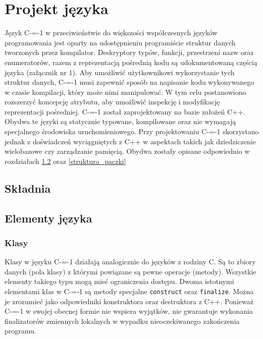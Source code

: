 \section{Projekt języka}
\label{Language_desig}
Język C-=-1 w przeciwieństwie do większości współczesnych języków programowania jest oparty na udostępnieniu programiście struktur danych tworzonych przez kompilator. Deskryptory typów, funkcji, przestrzeni nazw oraz enumeratorów, razem z reprezentacją pośrednią kodu są udokumentowaną częścią języka (załącznik nr 1).
Aby umożliwić użytkownikowi wykorzystanie tych struktur danych, C-=-1 musi zapewnić sposób na napisanie kodu wykonywanego w czasie kompilacji, który może nimi manipulować. W tym celu postanowiono rozszerzyć koncepcję atrybutu, aby umożliwić inspekcję i modyfikację reprezentacji pośredniej.
C-=-1 został zaprojektowany na bazie założeń C++. Obydwa te języki są statycznie typowane, kompilowane oraz nie wymagają specjalnego środowiska uruchomieniowego.
Przy projektowaniu C-=-1 skorzystano jednak z doświadczeń wyciągniętych z C++ w aspektach takich jak dziedziczenie wielobazowe czy zarządzanie pamięcią. Obydwa zostały opisane odpowiednio w rozdziałach \ref{elementy_jezyka} oraz \ref{struktura_paczki}

\subsection{Składnia}

\subsection{Elementy języka}
\label{elementy_jezyka}

\subsubsection{Klasy}
\label{classes_definition}
Klasy w języku C-=-1 działają analogicznie do języków z rodziny C.
Są to zbiory danych (pola klasy) z którymi powiązane są pewne operacje (metody).
Wszystkie elementy takiego typu mogą mieć ograniczenia dostępu.
Dwoma istotnymi elementami klas w C-=-1 są metody specjalne \lstinline{construct} oraz \lstinline{finalize}.
Można je zrozumieć jako odpowiedniki konstruktora oraz destruktora z C++.
Ponieważ C-=-1 w swojej obecnej formie nie wspiera wyjątków, nie gwarantuje wykonania finalizatorów zmiennych lokalnych w wypadku nieoczekiwanego zakończenia programu.

